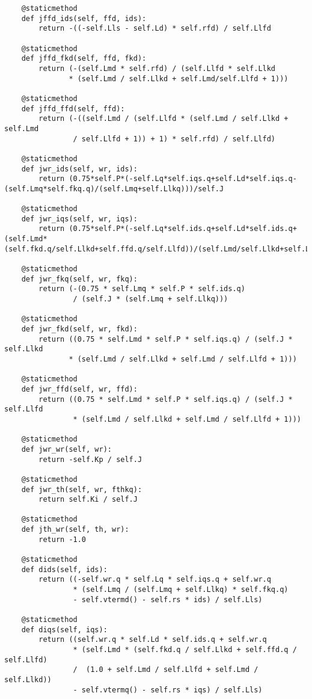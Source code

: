 \begin{lstlisting}
    @staticmethod
    def jffd_ids(self, ffd, ids):
        return -((-self.Lls - self.Ld) * self.rfd) / self.Llfd

    @staticmethod
    def jffd_fkd(self, ffd, fkd):
        return (-(self.Lmd * self.rfd) / (self.Llfd * self.Llkd
               * (self.Lmd / self.Llkd + self.Lmd/self.Llfd + 1)))

    @staticmethod
    def jffd_ffd(self, ffd):
        return (-((self.Lmd / (self.Llfd * (self.Lmd / self.Llkd + self.Lmd
                / self.Llfd + 1)) + 1) * self.rfd) / self.Llfd)

    @staticmethod
    def jwr_ids(self, wr, ids):
        return (0.75*self.P*(-self.Lq*self.iqs.q+self.Ld*self.iqs.q-(self.Lmq*self.fkq.q)/(self.Lmq+self.Llkq)))/self.J

    @staticmethod
    def jwr_iqs(self, wr, iqs):
        return (0.75*self.P*(-self.Lq*self.ids.q+self.Ld*self.ids.q+(self.Lmd*(self.fkd.q/self.Llkd+self.ffd.q/self.Llfd))/(self.Lmd/self.Llkd+self.Lmd/self.Llfd+1.0)))/self.J

    @staticmethod
    def jwr_fkq(self, wr, fkq):
        return (-(0.75 * self.Lmq * self.P * self.ids.q)
                / (self.J * (self.Lmq + self.Llkq)))

    @staticmethod
    def jwr_fkd(self, wr, fkd):
        return ((0.75 * self.Lmd * self.P * self.iqs.q) / (self.J * self.Llkd
               * (self.Lmd / self.Llkd + self.Lmd / self.Llfd + 1)))

    @staticmethod
    def jwr_ffd(self, wr, ffd):
        return ((0.75 * self.Lmd * self.P * self.iqs.q) / (self.J * self.Llfd
                * (self.Lmd / self.Llkd + self.Lmd / self.Llfd + 1)))

    @staticmethod
    def jwr_wr(self, wr):
        return -self.Kp / self.J

    @staticmethod
    def jwr_th(self, wr, fthkq):
        return self.Ki / self.J

    @staticmethod
    def jth_wr(self, th, wr):
        return -1.0

    @staticmethod
    def dids(self, ids):
        return ((-self.wr.q * self.Lq * self.iqs.q + self.wr.q
                * (self.Lmq / (self.Lmq + self.Llkq) * self.fkq.q)
                - self.vtermd() - self.rs * ids) / self.Lls)

    @staticmethod
    def diqs(self, iqs):
        return ((self.wr.q * self.Ld * self.ids.q + self.wr.q
                * (self.Lmd * (self.fkd.q / self.Llkd + self.ffd.q / self.Llfd)
                /  (1.0 + self.Lmd / self.Llfd + self.Lmd / self.Llkd))
                - self.vtermq() - self.rs * iqs) / self.Lls)


\end{lstlisting}
